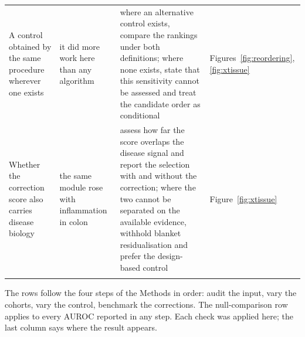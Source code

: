 \documentclass[unnumsec,webpdf,contemporary,large,numbered]{oup-authoring-template}
\begin{document}
\begin{table}[!t]
\begin{tabular*}{\textwidth}{@{\extracolsep\fill}>{\raggedright\arraybackslash}p{40mm}>{\raggedright\arraybackslash}p{44mm}>{\raggedright\arraybackslash}p{58mm}>{\raggedright\arraybackslash}p{28mm}@{\extracolsep\fill}}
A control obtained by the same procedure wherever one exists & it did more work here than any algorithm & where an alternative control exists, compare the rankings under both definitions; where none exists, state that this sensitivity cannot be assessed and treat the candidate order as conditional & Figures~\ref{fig:reordering}, \ref{fig:xtissue} \\
Whether the correction score also carries disease biology & the same module rose with inflammation in colon & assess how far the score overlaps the disease signal and report the selection with and without the correction; where the two cannot be separated on the available evidence, withhold blanket residualisation and prefer the design-based control & Figure~\ref{fig:xtissue} \\
\botrule
\end{tabular*}
\begin{tablenotes}%
\item The rows follow the four steps of the Methods in order: audit the input, vary the cohorts, vary the control, benchmark the corrections. The null-comparison row applies to every AUROC reported in any step. Each check was applied here; the last column says where the result appears.
\end{tablenotes}
\end{table}
\end{document}
